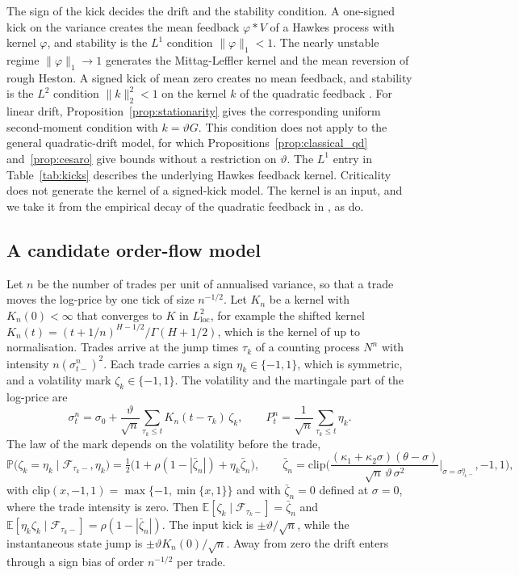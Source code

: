 \documentclass[11pt,a4paper]{article}
\theoremstyle{definition}
\newcommand{\E}{\mathbb{E}}
\renewcommand{\P}{\mathbb{P}}
\newcommand{\F}{\mathcal{F}}
\begin{document}
The sign of the kick decides the drift and the stability condition. A one-signed kick on the variance creates the mean feedback $\varphi*V$ of a Hawkes process with kernel $\varphi$, and stability is the $L^1$ condition $\|\varphi\|_1<1$. The nearly unstable regime $\|\varphi\|_1\to1$ generates the Mittag-Leffler kernel and the mean reversion of rough Heston. A signed kick of mean zero creates no mean feedback, and stability is the $L^2$ condition $\|k\|_2^2<1$ on the kernel $k$ of the quadratic feedback \citep{BlancDonierBouchaud2017}. For linear drift, Proposition~\ref{prop:stationarity} gives the corresponding uniform second-moment condition with $k=\vartheta G$. This condition does not apply to the general quadratic-drift model, for which Propositions~\ref{prop:classical_qd} and~\ref{prop:cesaro} give bounds without a restriction on $\vartheta$. The $L^1$ entry in Table~\ref{tab:kicks} describes the underlying Hawkes feedback kernel. Criticality does not generate the kernel of a signed-kick model. The kernel is an input, and we take it from the empirical decay of the quadratic feedback in \citet{BlancDonierBouchaud2017}, as \citet{GatheralJusselinRosenbaum2020} do.


\subsection{A candidate order-flow model}\label{sec:micro_model}

Let $n$ be the number of trades per unit of annualised variance, so that a trade moves the log-price by one tick of size $n^{-1/2}$. Let $K_n$ be a kernel with $K_n(0)<\infty$ that converges to $K$ in $L^2_{\mathrm{loc}}$, for example the shifted kernel $K_n(t)=(t+1/n)^{H-1/2}/\Gamma(H+1/2)$, which is the kernel of \citet{HagerHorstWagenhoferXu2026} up to normalisation. Trades arrive at the jump times $\tau_k$ of a counting process $N^n$ with intensity $n(\sigma^n_{t-})^2$. Each trade carries a sign $\eta_k\in\{-1,1\}$, which is symmetric, and a volatility mark $\zeta_k\in\{-1,1\}$. The volatility and the martingale part of the log-price are
\begin{equation}\label{eq:micro}
\sigma^n_t=\sigma_0+\frac{\vartheta}{\sqrt n}\sum_{\tau_k\le t}K_n(t-\tau_k)\,\zeta_k,\qquad P^n_t=\frac1{\sqrt n}\sum_{\tau_k\le t}\eta_k .
\end{equation}
The law of the mark depends on the volatility before the trade,
\begin{equation}\label{eq:bias}
\P\big(\zeta_k=\eta_k\mid\F_{\tau_k-},\eta_k\big)=\tfrac12\big(1+\rho(1-|\bar\zeta_n|)+\eta_k\bar\zeta_n\big),\qquad \bar\zeta_n=\mathrm{clip}\bigg(\frac{(\kappa_1+\kappa_2\sigma)(\theta-\sigma)}{\sqrt n\,\vartheta\,\sigma^2}\bigg|_{\sigma=\sigma^n_{\tau_k-}},-1,1\bigg),
\end{equation}
with $\mathrm{clip}(x,-1,1)=\max\{-1,\min\{x,1\}\}$ and with $\bar\zeta_n=0$ defined at $\sigma=0$, where the trade intensity is zero. Then $\E[\zeta_k\mid\F_{\tau_k-}]=\bar\zeta_n$ and $\E[\eta_k\zeta_k\mid\F_{\tau_k-}]=\rho(1-|\bar\zeta_n|)$. The input kick is $\pm\vartheta/\sqrt n$, while the instantaneous state jump is $\pm\vartheta K_n(0)/\sqrt n$. Away from zero the drift enters through a sign bias of order $n^{-1/2}$ per trade.
\end{document}
